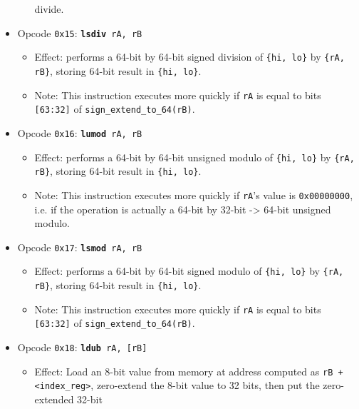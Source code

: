 \documentclass{article}
\begin{document}
\begin{itemize}
\begin{itemize}
		divide.
		\end{itemize}
	\item Opcode \texttt{0x15}:
		\texttt{\textbf{lsdiv} rA, rB}
		\begin{itemize}
		\item Effect: performs a 64-bit by 64-bit signed division of
		\texttt{\{hi, lo\}} by \texttt{\{rA, rB\}}, storing 64-bit
		result in \texttt{\{hi, lo\}}.
		\item Note: This instruction executes more quickly if
		\texttt{rA} is equal to bits \texttt{[63:32]} of
		\texttt{sign\_extend\_to\_64(rB)}.
		\end{itemize}
	\item Opcode \texttt{0x16}:
		\texttt{\textbf{lumod} rA, rB}
		\begin{itemize}
		\item Effect: performs a 64-bit by 64-bit unsigned modulo of
		\texttt{\{hi, lo\}} by \texttt{\{rA, rB\}}, storing 64-bit
		result in \texttt{\{hi, lo\}}.
		\item Note: This instruction executes more quickly if
		\texttt{rA}'s value is \texttt{0x00000000}, i.e. if the
		operation is actually a 64-bit by 32-bit -> 64-bit unsigned
		modulo.
		\end{itemize}
	\item Opcode \texttt{0x17}:
		\texttt{\textbf{lsmod} rA, rB}
		\begin{itemize}
		\item Effect: performs a 64-bit by 64-bit signed modulo of
		\texttt{\{hi, lo\}} by \texttt{\{rA, rB\}}, storing 64-bit
		result in \texttt{\{hi, lo\}}.
		\item Note: This instruction executes more quickly if
		\texttt{rA} is equal to bits \texttt{[63:32]} of
		\texttt{sign\_extend\_to\_64(rB)}.
		\end{itemize}
	\item Opcode \texttt{0x18}:
		\texttt{\textbf{ldub} rA, [rB]}
		\begin{itemize}
		\item Effect: Load an 8-bit value from memory at address
		computed as \texttt{rB + <index\_reg>}, zero-extend
		the 8-bit value to 32 bits, then put the zero-extended 32-bit

\end{itemize}
\end{itemize}
\end{document}
